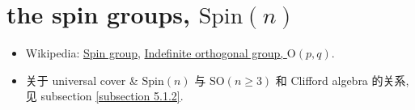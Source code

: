 \chapter{the spin groups, \texorpdfstring{$\mathrm{Spin}(n)$}{Spin(n)}}
\begin{itemize}
	\item Wikipedia: \href{https://en.wikipedia.org/wiki/Spin_group}{Spin group}, \href{https://en.wikipedia.org/wiki/Indefinite_orthogonal_group}{Indefinite orthogonal group, $\mathrm{O}(p, q)$}.
	
	\item 关于 universal cover \& $\mathrm{Spin}(n)$ 与 $\mathrm{SO}(n \geq 3)$ 和 Clifford algebra 的关系, 见 subsection \ref{subsection 5.1.2}.
\end{itemize}
